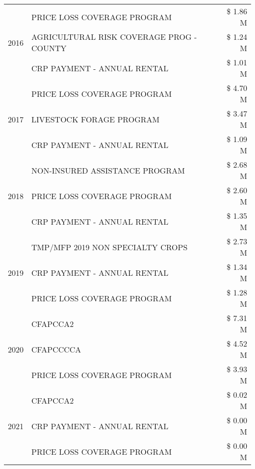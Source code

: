 \begin{tabular}{llr}
\cline{1-3}
\multirow[t]{3}{*}{2016} & PRICE LOSS COVERAGE PROGRAM & \$ 1.86 M \\
 & AGRICULTURAL RISK COVERAGE PROG - COUNTY & \$ 1.24 M \\
 & CRP PAYMENT - ANNUAL RENTAL & \$ 1.01 M \\
\cline{1-3}
\multirow[t]{3}{*}{2017} & PRICE LOSS COVERAGE PROGRAM & \$ 4.70 M \\
 & LIVESTOCK FORAGE PROGRAM & \$ 3.47 M \\
 & CRP PAYMENT - ANNUAL RENTAL & \$ 1.09 M \\
\cline{1-3}
\multirow[t]{3}{*}{2018} & NON-INSURED ASSISTANCE PROGRAM & \$ 2.68 M \\
 & PRICE LOSS COVERAGE PROGRAM & \$ 2.60 M \\
 & CRP PAYMENT - ANNUAL RENTAL & \$ 1.35 M \\
\cline{1-3}
\multirow[t]{3}{*}{2019} & TMP/MFP 2019 NON SPECIALTY CROPS & \$ 2.73 M \\
 & CRP PAYMENT - ANNUAL RENTAL & \$ 1.34 M \\
 & PRICE LOSS COVERAGE PROGRAM & \$ 1.28 M \\
\cline{1-3}
\multirow[t]{3}{*}{2020} & CFAPCCA2 & \$ 7.31 M \\
 & CFAPCCCCA & \$ 4.52 M \\
 & PRICE LOSS COVERAGE PROGRAM & \$ 3.93 M \\
\cline{1-3}
\multirow[t]{3}{*}{2021} & CFAPCCA2 & \$ 0.02 M \\
 & CRP PAYMENT - ANNUAL RENTAL & \$ 0.00 M \\
 & PRICE LOSS COVERAGE PROGRAM & \$ 0.00 M \\
\cline{1-3}
\bottomrule
\end{tabular}
